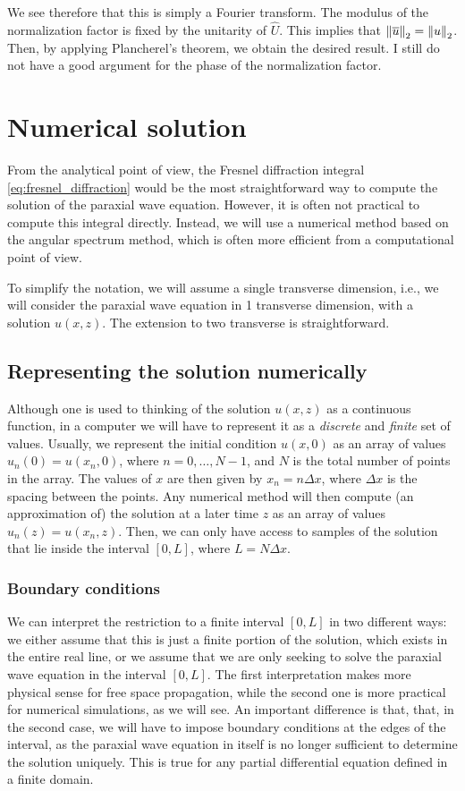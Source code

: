 \documentclass[a4paper,10pt]{report}
\begin{document}
We see therefore that this is simply a Fourier transform.
The modulus of the normalization factor is fixed by the unitarity of $\hat{U}$. This implies that $\norm{\overline{u}}_2 = \norm{u}_2$. Then, by applying Plancherel's theorem, we obtain the desired result. I still do not have a good argument for the phase of the normalization factor.

\chapter{Numerical solution}

From the analytical point of view, the Fresnel diffraction integral \eqref{eq:fresnel_diffraction} would be the most straightforward way to compute the solution of the paraxial wave equation. However, it is often not practical to compute this integral directly. Instead, we will use a numerical method based on the angular spectrum method, which is often more efficient from a computational point of view.

To simplify the notation, we will assume a single transverse dimension, i.e., we will consider the paraxial wave equation in 1 transverse dimension, with a solution $u(x,z)$. The extension to two transverse  is straightforward.

\section{Representing the solution numerically}

Although one is used to thinking of the solution $u(x,z)$ as a continuous function, in a computer we will have to represent it as a \textit{discrete} and \textit{finite} set of values. Usually, we represent the initial condition $u(x,0)$ as an array of values $u_n(0) = u(x_n, 0)$, where $n = 0, \ldots, N-1$, and $N$ is the total number of points in the array. The values of $x$ are then given by $x_n = n \Delta x$, where $\Delta x$ is the spacing between the points. Any numerical method will then compute (an approximation of) the solution at a later time $z$ as an array of values $u_n(z) = u(x_n, z)$. Then, we can only have access to samples of the solution that lie inside the interval $[0, L]$, where $L = N \Delta x$.

\subsection{Boundary conditions}

We can interpret the restriction to a finite interval $[0, L]$ in two different ways: we either assume that this is just a finite portion of the solution, which exists in the entire real line, or we assume that we are only seeking to solve the paraxial wave equation in the interval $[0, L]$. The first interpretation makes more physical sense for free space propagation, while the second one is more practical for numerical simulations, as we will see. An important difference is that, that, in the second case, we will have to impose boundary conditions at the edges of the interval, as the paraxial wave equation in itself is no longer sufficient to determine the solution uniquely. This is true for any partial differential equation defined in a finite domain. 
\end{document}
